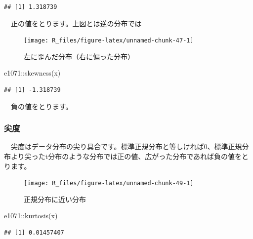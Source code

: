 \documentclass[
  12pt,
]{book}
\newenvironment{Shaded}{\begin{snugshade}}{\end{snugshade}}
\newcommand{\FunctionTok}[1]{\textcolor[rgb]{0.00,0.00,0.00}{#1}}
\newcommand{\NormalTok}[1]{#1}
\newcommand{\SpecialCharTok}[1]{\textcolor[rgb]{0.00,0.00,0.00}{#1}}
\begin{document}
\begin{verbatim}
## [1] 1.318739
\end{verbatim}

　正の値をとります。上図とは逆の分布では

\begin{figure}[H]

{\centering \texttt{[image: R\_files/figure-latex/unnamed-chunk-47-1]} 

}

\caption{左に歪んだ分布（右に偏った分布）}\label{fig:unnamed-chunk-47}
\end{figure}

\begin{Shaded}
\begin{Highlighting}[numbers=left,,]
\NormalTok{e1071}\SpecialCharTok{::}\FunctionTok{skewness}\NormalTok{(x)}
\end{Highlighting}
\end{Shaded}

\begin{verbatim}
## [1] -1.318739
\end{verbatim}

　負の値をとります。

\hypertarget{ux5c16ux5ea6}{%
\subsubsection*{尖度}\label{ux5c16ux5ea6}}

　尖度はデータ分布の尖り具合です。標準正規分布と等しければ\(0\)、標準正規分布より尖ったt分布のような分布では正の値、広がった分布であれば負の値をとります。

\begin{figure}[H]

{\centering \texttt{[image: R\_files/figure-latex/unnamed-chunk-49-1]} 

}

\caption{正規分布に近い分布}\label{fig:unnamed-chunk-49}
\end{figure}

\begin{Shaded}
\begin{Highlighting}[numbers=left,,]
\NormalTok{e1071}\SpecialCharTok{::}\FunctionTok{kurtosis}\NormalTok{(x)}
\end{Highlighting}
\end{Shaded}

\begin{verbatim}
## [1] 0.01457407
\end{verbatim}
\end{document}

